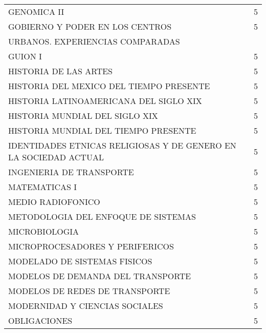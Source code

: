 \documentclass[12pt]{article}
\begin{document}
\begin{table}[ht]
{\begin{tabular}{lr}
  GENOMICA II & 5 \\ 
  GOBIERNO Y PODER EN LOS CENTROS & 5 \\ 
   URBANOS. EXPERIENCIAS COMPARADAS &  \\ 
  GUION I & 5 \\ 
  HISTORIA DE LAS ARTES & 5 \\ 
  HISTORIA DEL MEXICO DEL TIEMPO PRESENTE & 5 \\ 
  HISTORIA LATINOAMERICANA DEL SIGLO XIX & 5 \\ 
  HISTORIA MUNDIAL DEL SIGLO XIX & 5 \\ 
  HISTORIA MUNDIAL DEL TIEMPO PRESENTE & 5 \\ 
  IDENTIDADES ETNICAS RELIGIOSAS Y DE GENERO EN LA SOCIEDAD ACTUAL & 5 \\ 
  INGENIERIA DE TRANSPORTE & 5 \\ 
  MATEMATICAS I & 5 \\ 
  MEDIO RADIOFONICO & 5 \\ 
  METODOLOGIA DEL ENFOQUE DE SISTEMAS & 5 \\ 
  MICROBIOLOGIA & 5 \\ 
  MICROPROCESADORES Y PERIFERICOS & 5 \\ 
  MODELADO DE SISTEMAS FISICOS & 5 \\ 
  MODELOS DE DEMANDA DEL TRANSPORTE & 5 \\ 
  MODELOS DE REDES DE TRANSPORTE & 5 \\ 
  MODERNIDAD Y CIENCIAS SOCIALES & 5 \\ 
  OBLIGACIONES & 5 \\ 
   \hline
\end{tabular}}
\end{table}
\end{document}

